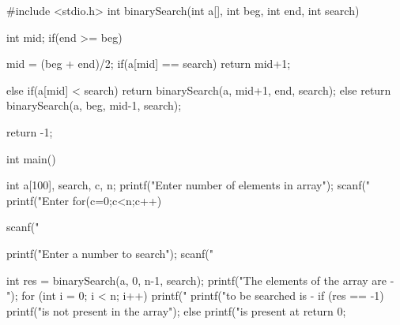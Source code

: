 #include <stdio.h>
int binarySearch(int a[], int beg, int end, int search)
{
    int mid;
    if(end >= beg)
    {        mid = (beg + end)/2;
        if(a[mid] == search)
        {
            return mid+1;
        }

        else if(a[mid] < search)
        {
            return binarySearch(a, mid+1, end, search);
        }
        else
        {
            return binarySearch(a, beg, mid-1, search);
        }
    }
    return -1;
}
int main()
{
 int a[100], search, c, n;
 printf("Enter number of elements in array\n"); scanf("%
 printf("Enter %
for(c=0;c<n;c++)
{
   scanf("%

}
printf("Enter a number to search\n");
   scanf("%

  int res = binarySearch(a, 0, n-1, search);
  printf("The elements of the array are - ");
  for (int i = 0; i < n; i++)
  printf("%
  printf("\nElement to be searched is - %
  if (res == -1)
  printf("\nElement is not present in the array");
  else
  printf("\nElement is present at %
  return 0;
}
